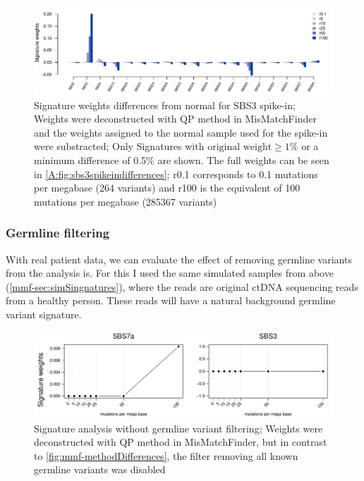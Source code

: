 \begin{figure}[!ht]
\centering
\includegraphics[width=.99\linewidth]{Figures/MisMatchFinder/SBS3SpikeInSignatureDifferencesFocussed.pdf}
\caption[Signature weights differences from normal for SBS3 spike-in]{Signature weights differences from normal for SBS3 spike-in; Weights were deconstructed with QP method in MisMatchFinder and the weights assigned to the normal sample used for the spike-in were substracted; Only Signatures with $\text{original weight}\geq 1\%$ or a minimum difference of 0.5\% are shown. The full weights can be seen in \protect\autoref{A:fig:sbs3spikeindifferences}; r0.1 corresponds to 0.1 mutations per megabase (264 variants) and r100 is the equivalent of 100 mutations per megabase (285367 variants)}\label{fig:mmf-spikeSBS3signatures}
\end{figure}

\subsubsection{Germline filtering}
\label{mmf-sec:germlinefiltering}
With real patient data, we can evaluate the effect of removing germline variants from the analysis is. For this I used the same simulated samples from above (\autoref{mmf-sec:simSingnatures}), where the reads are original ctDNA sequencing reads from a healthy person. These reads will have a natural background germline variant signature.

\begin{figure}[!ht]
\centering
\includegraphics[width=.99\linewidth]{Figures/MisMatchFinder/noGermlineFilterAnalysis.pdf}
\caption[Signature analysis without germline variant filtering]{Signature analysis without germline variant filtering; Weights were deconstructed with QP method in MisMatchFinder, but in contrast to \protect\autoref{fig:mmf-methodDifferences}, the filter removing all known germline variants was disabled}\label{fig:mmf-noGermlineFilterAnalysis}
\end{figure}

